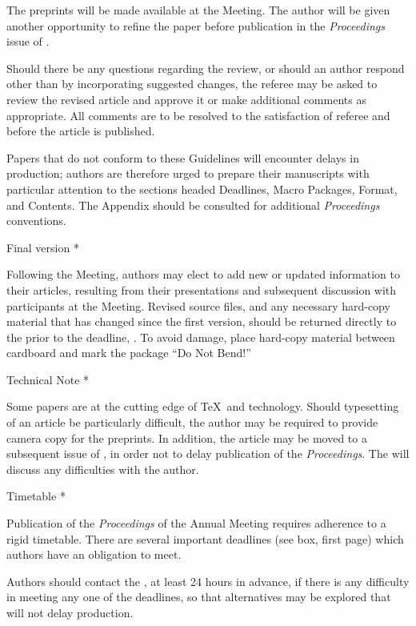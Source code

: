 The preprints will be made available at the Meeting. The author will be
given another opportunity to refine the paper before publication in the
{\sl Proceedings\/} issue of \TUB.

Should there be any questions regarding the review, or should an author
respond other than by incorporating suggested changes, the referee may
be asked to review the revised article and approve it or make additional
comments as appropriate.  All comments are to be resolved to the
satisfaction of referee and \editor{} before the article is published.

Papers that do not conform to these Guidelines will encounter delays in
production; authors are therefore urged to prepare their manuscripts
with particular attention to the sections headed Deadlines, Macro
Packages, Format, and Contents.  The Appendix should be consulted for
additional {\sl Proceedings\/} conventions.

\subhead * Final version *

Following the Meeting, authors may elect to add new or updated
information to their articles, resulting from their presentations and
subsequent discussion with participants at the Meeting.
Revised source files, and any necessary hard-copy material
that has changed since the first version, should be
returned directly to the \editor{} prior to the deadline, {\bf
\CameraDeadline}.  To avoid damage, place hard-copy material between
cardboard and mark the package ``Do Not Bend!''

\subhead * Technical Note *

Some papers are at the cutting edge of \TeX\ and technology.  Should
typesetting of an article be particularly difficult, the author may be
required to provide camera copy for the preprints.  In addition, the
article may be moved to a subsequent issue of \TUB, in order not to
delay publication of the {\sl Proceedings}.  The \editor{} will discuss
any difficulties with the author.

\head * Timetable *

Publication of the {\sl Proceedings\/} of the Annual Meeting requires
adherence to a rigid timetable.  There are several important deadlines
(see box, first page) which authors have an obligation to meet.

Authors should contact the \editor, at least 24 hours in advance, if
there is any difficulty in meeting any one of the deadlines, so that
alternatives may be explored that will not delay production.

